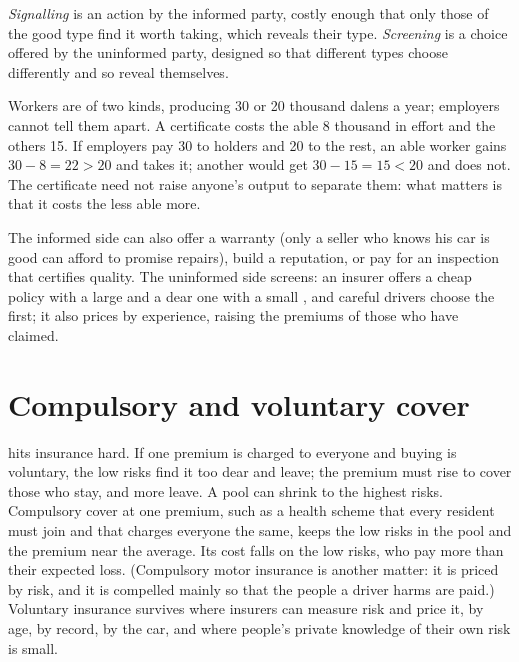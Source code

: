 \begin{definition}\label{def:g11:asymmetric-information:signalling}
\emph{Signalling} is an action by the informed party, costly enough that only those of the good type find it worth taking, which reveals their
type. \emph{Screening}\label{def:g11:asymmetric-information:screening} is a choice offered by the uninformed party, designed so
that different types choose differently and so reveal themselves.
\end{definition}

\begin{example}\label{ex:g11:asymmetric-information:signal}
Workers are of two kinds, producing 30 or 20 thousand dalens a year; employers cannot tell them apart. A certificate costs the able 8 thousand in effort and the others 15.
If employers pay 30 to holders and 20 to the rest, an able worker gains $30 - 8 = 22 > 20$ and takes it; another would get $30 - 15 = 15 < 20$ and does not. The
certificate need not raise anyone's output to separate them: what matters is that it costs the less able more.
\end{example}

The informed side can also offer a warranty (only a seller who knows his car is good can afford to promise repairs), build a reputation, or pay for an inspection that
certifies quality. The uninformed side screens: an insurer offers a cheap policy with a large  and a dear one with a small , and careful drivers
choose the first; it also prices by experience, raising the premiums of those who have claimed.

\section{Compulsory and voluntary cover}\label{sec:g11:asymmetric-information:compulsory}

 hits insurance hard. If one premium is charged to everyone and buying is voluntary, the low risks find it too dear and leave; the premium must rise to
cover those who stay, and more leave. A pool can shrink to the highest risks. Compulsory cover at one premium, such as a health scheme that every resident must join and that
charges everyone the same, keeps the low risks in the pool and the premium near the average. Its cost falls on the low risks, who pay more than
their expected loss. (Compulsory motor insurance is another matter: it is priced by risk, and it is compelled mainly so that the people a driver
harms are paid.) Voluntary insurance survives
where insurers can measure risk and price it, by age, by record, by the car, and where people's private knowledge of their own risk is small.

